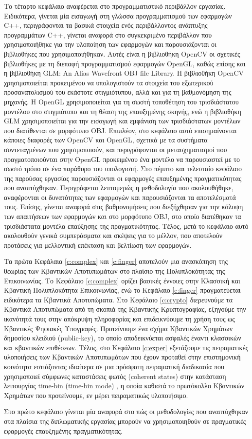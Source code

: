 Το τέταρτο κεφάλαιο αναφέρεται στο προγραμματιστικό περιβάλλον εργασίας. Ειδικότερα, γίνεται μία εισαγωγή στη γλώσσα προγραμματισμού των εφαρμογών C++, περιγράφονται τα βασικά στοιχεία ενός περιβάλλοντος ανάπτυξης προγραμμάτων C++, γίνεται αναφορά στο συγκεκριμένο περιβάλλον που χρησιμοποιήθηκε για την υλοποίηση των εφαρμογών και παρουσιάζονται οι βιβλιοθήκες που χρησιμοποιήθηκαν. Αυτές είναι η βιβλιοθήκη OpenCV οι σχετικές βιβλιοθήκες με τη διεπαφή προγραμματισμού εφαρμογών OpenGL, καθώς επίσης και η βιβλιοθήκη GLM: An Alias Wavefront OBJ file Library. Η βιβλιοθήκη OpenCV χρησιμοποιείται προκειμένου να υπολογιστούν τα στοιχεία του εξωτερικού προσανατολισμού του εκάστοτε στιγμιότυπου, αλλά και για τη βαθμονόμηση της μηχανής. Η ΟpenGL χρησιμοποιείται για τη σωστή τοποθέτηση του τρισδιάστατου μοντέλου στο στιγμιότυπο και τη θέαση της επαυξημένης σκηνής, ενώ η βιβλιοθήκη GLM χρησιμοποιείται για την εισαγωγή και εμφάνιση των τρισδιάστατων μοντέλων που διατίθενται σε μορφότυπο OBJ. Επιπλέον, στο κεφάλαιο αυτό επισημαίνονται κάποιες διαφορές των OpenCV και OpenGL, σχετικά με τα συστήματα συντεταγμένων που χρησιμοποιούν, και περιγράφονται οι μετασχηματισμοί που πραγματοποιούνται στην OpenGL προκειμένου ένα μοντέλο να παρουσιαστεί με το σωστό τρόπο σε ένα παράθυρο του υπολογιστή. Στο πέμπτο και τελευταίο κεφάλαιο της παρούσας εργασίας παρουσιάζονται οι εφαρμογές επαυξημένης πραγματικότητας που αναπτύχθηκαν. Περιγράφεται λεπτομερώς η μεθοδολογία που ακολουθήθηκε, αναφέρονται οι δυνατότητες των εφαρμογών και παρουσιάζονται τα αποτελέσματά τους. Επίσης, γίνεται αναφορά στις βαθμονομήσεις που διεξήχθησαν για την κάλυψη των απαιτήσεων των εφαρμογών και στο μορφότυπο OBJ, στο οποίο διατέθηκαν τα τρισδιάστατα μοντέλα επαύξησης της πραγματικότητας. Τέλος, μετά το κεφάλαιο αυτό ακολουθούν γενικά συμπεράσματα και σκέψεις για το μέλλον, που αποτελούν προτάσεις για μελλοντική επέκταση και βελτίωση των εφαρμογών.


Τα πρώτα Κεφάλαια \ref{c:complex} και \ref{c:finger} αποτελούν μια ανασκόπηση της θεωρίας των Κβαντικών Αποτυπωμάτων στο πλαίσιο της Πολυπλοκότητας της Επικοινωνίας. Το Κεφάλαιο \ref{c:complex} ορίζει βασικές έννοιες στην Κλασσική και Κβαντική Πολυπλοκότητα Επικοινωνίας, ενώ το Κεφάλαιο \ref{c:finger} πραγματεύεται ειδικότερα τα Κβαντικά Αποτυπώματα. Στο Κεφάλαιο \ref{c:crypto} διερευνούμε τα Κβαντικά Αποτυπώματα από τη σκοπιά της Κβαντικής Κρυπτογραφίας, εξηγούμε την ικανότητά τους στην απόκρυψη πληροφορίας και επιδεικνύουμε  τη χρήση τους ως Κβαντικές Ψηφιακές Υπογραφές. Προτείνουμε ένα σχήμα Κβαντικών Χρημάτων δημοσίου κλειδιού (public-key), το οποίο αποδεικνύεται ασφαλές έναντι κλασσικών και κβαντικών επιθέσεων. Τέλος, στο Κεφάλαιο \ref{c:exper} εξετάζουμε τις πειραματικές υλοποιήσεις των Κβαντικών Αποτυπωμάτων που έχουν προταθεί στην επιστημονική κοινότητα εστιάζοντας ιδιαίτερα σε μια πρόσφατη πειραματική διαδικασία που χρησιμοποιεί σύμφωνες καταστάσεις φωτός (coherent states) στην κατάσταση λειτουργίας time-bin (time-bin mode) \cite{constant}, η οποία καθιστά το πρωτόκολλο Κβαντικών Χρημάτων που προτείνουμε, εν μέρει πειραματικώς υλοποιήσιμο.

Στο πρώτο κεφάλαιο γίνεται μία αναφορά στο πώς οι μεθοδολογίες που αναπτύχθηκαν στα πλαίσια της διπλωματικής εργασίας μπορούν να χρησιμοποιηθούν σε πραγματικές εφαρμογές επαυξημένης πραγματικότητας.

